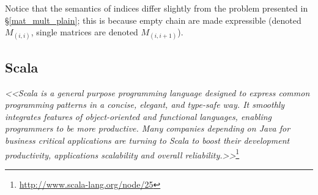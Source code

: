 Notice that the semantics of indices differ slightly from the problem presented in \S\ref{mat_mult_plain}; this is because empty chain are made expressible (denoted $M_{(i,i)}$, single matrices are denoted $M_{(i,i+1)}$).

\newpage
\subsection{Scala} \label{bg_scala}
\textit{<<Scala is a general purpose programming language designed to express common programming patterns in a concise, elegant, and type-safe way. It smoothly integrates features of object-oriented and functional languages, enabling programmers to be more productive. Many companies depending on Java for business critical applications are turning to Scala to boost their development productivity, applications scalability and overall reliability.>>}\footnote{\url{http://www.scala-lang.org/node/25}}

